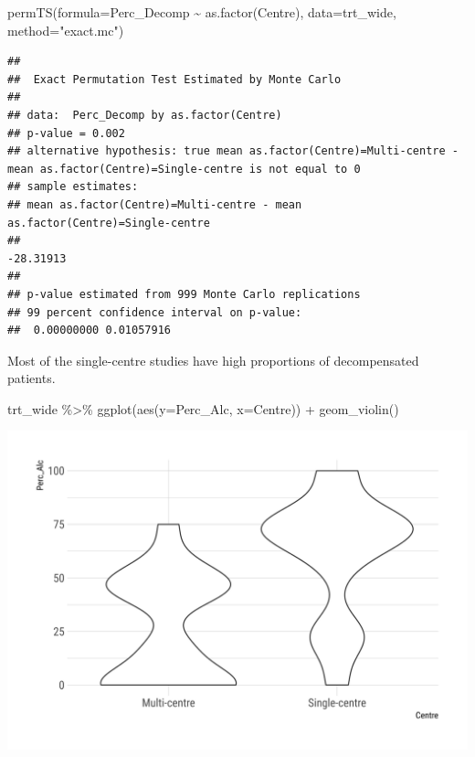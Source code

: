 \documentclass[
]{article}
\newenvironment{Shaded}{\begin{snugshade}}{\end{snugshade}}
\newcommand{\AttributeTok}[1]{\textcolor[rgb]{0.77,0.63,0.00}{#1}}
\newcommand{\FunctionTok}[1]{\textcolor[rgb]{0.00,0.00,0.00}{#1}}
\newcommand{\NormalTok}[1]{#1}
\newcommand{\SpecialCharTok}[1]{\textcolor[rgb]{0.00,0.00,0.00}{#1}}
\newcommand{\StringTok}[1]{\textcolor[rgb]{0.31,0.60,0.02}{#1}}
\begin{document}
\begin{Shaded}
\begin{Highlighting}[]
\FunctionTok{permTS}\NormalTok{(}\AttributeTok{formula=}\NormalTok{Perc\_Decomp }\SpecialCharTok{\textasciitilde{}} \FunctionTok{as.factor}\NormalTok{(Centre), }\AttributeTok{data=}\NormalTok{trt\_wide,}
          \AttributeTok{method=}\StringTok{"exact.mc"}\NormalTok{)}
\end{Highlighting}
\end{Shaded}

\begin{verbatim}
## 
##  Exact Permutation Test Estimated by Monte Carlo
## 
## data:  Perc_Decomp by as.factor(Centre)
## p-value = 0.002
## alternative hypothesis: true mean as.factor(Centre)=Multi-centre - mean as.factor(Centre)=Single-centre is not equal to 0
## sample estimates:
## mean as.factor(Centre)=Multi-centre - mean as.factor(Centre)=Single-centre 
##                                                                  -28.31913 
## 
## p-value estimated from 999 Monte Carlo replications
## 99 percent confidence interval on p-value:
##  0.00000000 0.01057916
\end{verbatim}

Most of the single-centre studies have high proportions of decompensated
patients.

\begin{Shaded}
\begin{Highlighting}[]
\NormalTok{trt\_wide }\SpecialCharTok{\%\textgreater{}\%} 
  \FunctionTok{ggplot}\NormalTok{(}\FunctionTok{aes}\NormalTok{(}\AttributeTok{y=}\NormalTok{Perc\_Alc, }\AttributeTok{x=}\NormalTok{Centre)) }\SpecialCharTok{+} 
  \FunctionTok{geom\_violin}\NormalTok{()}
\end{Highlighting}
\end{Shaded}

\includegraphics{figures/unnamed-chunk-43-1.png}
\end{document}
